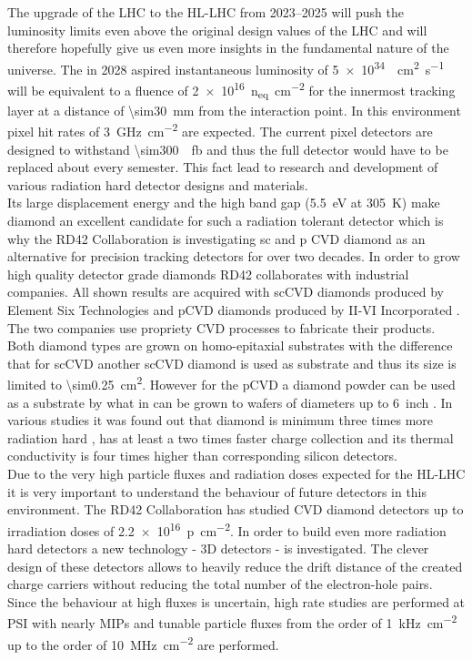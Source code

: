 The upgrade of the \ac{LHC} to the \ac{HL-LHC} from \SIrange{2023}{2025}{} \cite{hllhc} will push the luminosity limits even above the original design values of the \ac{LHC} and will therefore hopefully give us even more insights in the fundamental nature of the universe. The in 2028 aspired instantaneous luminosity of \SI{5e34}{\per\centi\meter\squared\per\second} will be equivalent to a fluence of \SI{2e16}{n_{eq}\per \centi\meter^2} \cite{auzinger} for the innermost tracking layer at a distance of \SI{\sim30}{\milli\meter} from the interaction point. In this environment pixel hit rates of \SI{3}{\giga\hertz\per\centi\meter^2} are expected. The current pixel detectors are designed to withstand \SI{\sim300}{\per\femto\barn} and thus the full detector would have to be replaced about every semester. This fact lead to research and development of various radiation hard detector designs and materials.\\
Its large displacement energy and the high band gap (\SI{5.5}{\electronvolt} at \SI{305}{\kelvin}) make diamond an excellent candidate for such a radiation tolerant detector which is why the RD42 Collaboration is investigating \ac{sc} and \ac{p} \ac{CVD} diamond as an alternative for precision tracking detectors for over two decades. In order to grow high quality detector grade diamonds RD42 collaborates with industrial companies. All shown results are acquired with \ac{sc}\ac{CVD} diamonds produced by Element Six Technologies \cite{e6} and \ac{p}\ac{CVD} diamonds produced by II-VI Incorporated \cite{II6}. The two companies use propriety \ac{CVD} processes to fabricate their products. Both diamond types are grown on homo-epitaxial substrates with the difference that for \ac{sc}\ac{CVD} another \ac{sc}\ac{CVD} diamond is used as substrate and thus its size is limited to \SI{\sim0.25}{\centi\meter\squared}. However for the \ac{p}\ac{CVD} a diamond powder can be used as a substrate by what in can be grown to wafers of diameters up to \SI{6}{inch} \cite{felix}. In various studies it was found out that diamond is minimum three times more radiation hard \cite{deboer}, has at least a two times faster charge collection \cite{pernegger} and its thermal conductivity is four times higher \cite{zhao} than corresponding silicon detectors.\\
Due to the very high particle fluxes and radiation doses expected for the \ac{HL-LHC} it is very important to understand the behaviour of future detectors in this environment. The RD42 Collaboration has studied \ac{CVD} diamond detectors up to irradiation doses of \SI{2.2e16}{p\per\centi\meter^2}. In order to build even more radiation hard detectors a new technology - 3D detectors \cite{3D} - is investigated. The clever design of these detectors allows to heavily reduce the drift distance of the created charge carriers without reducing the total number of the electron-hole pairs. Since the behaviour at high fluxes is uncertain, high rate studies are performed at \ac{PSI} with nearly \ac{MIPs} and tunable particle fluxes from the order of \SI{1}{\kilo\hertz\per cm^2} up to the order of \SI{10}{\mega\hertz\per cm^2} are performed.